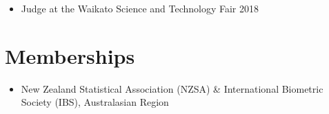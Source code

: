 \documentclass[10pt,a4paper]{moderncv}
\begin{document}
\begin{itemize}
  \item Judge at the Waikato Science and Technology Fair 2018
\end{itemize}




\section{Memberships}

\vspace{6pt}
\begin{itemize}
\item New Zealand Statistical Association (NZSA) \& International Biometric Society (IBS), Australasian Region
\end{itemize}
\end{document}
